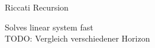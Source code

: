 \begin{frame}{Riccati Recursion}

Solves linear system fast \\
TODO: Vergleich verschiedener Horizon\\


\end{frame}

